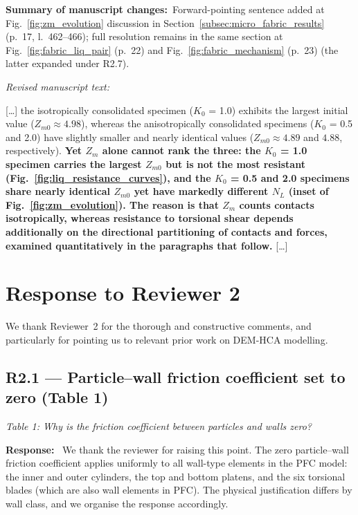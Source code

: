 \documentclass[11pt,a4paper]{article}
\newenvironment{rcomment}
  {\begin{leftbar}\color{black!75}\itshape}
  {\end{leftbar}\vspace{0.3em}}
\newcommand{\response}{\par\noindent\textbf{Response:}\ \ignorespaces}
\newcommand{\changed}[1]{\par\noindent\textbf{Summary of manuscript changes:}\ #1\par}
\newenvironment{revtext}
  {\par\vspace{0.2em}\noindent\textit{Revised manuscript text:}\par
   \begingroup\color{black}\begin{leftbar}\small}
  {\end{leftbar}\endgroup\vspace{0.3em}}
\newcommand{\manref}[1]{(#1)}                  %
\newcommand{\Kzero}{\ensuremath{K_0}}
\newcommand{\Zm}{\ensuremath{Z_m}}
\begin{document}
\changed{Forward-pointing sentence added at
Fig.~\ref{fig:zm_evolution} discussion in
Section~\ref{subsec:micro_fabric_results}
\manref{p.~17, l.~462--466}; full resolution remains in the same
section at Fig.~\ref{fig:fabric_liq_pair} \manref{p.~22} and
Fig.~\ref{fig:fabric_mechanism} \manref{p.~23} (the latter expanded
under R2.7).}

\begin{revtext}
[\ldots] the isotropically consolidated specimen (\Kzero{} = 1.0)
exhibits the largest initial value ($Z_{m0} \approx 4.98$), whereas
the anisotropically consolidated specimens (\Kzero{} = 0.5 and 2.0)
have slightly smaller and nearly identical values
($Z_{m0} \approx 4.89$ and $4.88$, respectively).
\textbf{Yet \Zm{} alone cannot rank the three: the \Kzero{} = 1.0
specimen carries the largest $Z_{m0}$ but is not the most resistant
(Fig.~\ref{fig:liq_resistance_curves}), and the \Kzero{} = 0.5 and
2.0 specimens share nearly identical $Z_{m0}$ yet have markedly
different $N_L$ (inset of Fig.~\ref{fig:zm_evolution}). The reason
is that \Zm{} counts contacts isotropically, whereas resistance to
torsional shear depends additionally on the directional partitioning
of contacts and forces, examined quantitatively in the paragraphs
that follow.} [\ldots]
\end{revtext}

\clearpage


\section*{Response to Reviewer 2}

We thank Reviewer~2 for the thorough and constructive comments, and
particularly for pointing us to relevant prior work on DEM-HCA modelling.

\subsection*{R2.1 --- Particle--wall friction coefficient set to zero (Table 1)}

\begin{rcomment}
Table 1: Why is the friction coefficient between particles and walls zero?
\end{rcomment}

\response
We thank the reviewer for raising this point. The zero
particle--wall friction coefficient applies uniformly to all
wall-type elements in the PFC model: the inner and outer
cylinders, the top and bottom platens, and the six torsional blades
(which are also wall elements in PFC). The physical justification
differs by wall class, and we organise the response accordingly.
\end{document}

